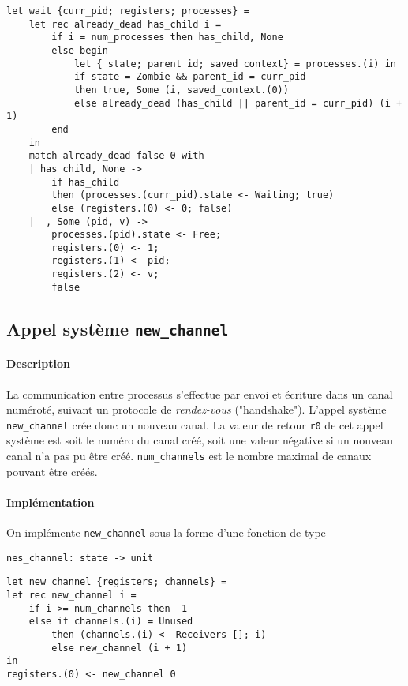 \documentclass[french, toc]{../cs-classes/cs-classes}
\begin{document}
\begin{verbatim}
let wait {curr_pid; registers; processes} =
    let rec already_dead has_child i =
        if i = num_processes then has_child, None
        else begin
            let { state; parent_id; saved_context} = processes.(i) in
            if state = Zombie && parent_id = curr_pid
            then true, Some (i, saved_context.(0))
            else already_dead (has_child || parent_id = curr_pid) (i + 1)
        end
    in
    match already_dead false 0 with
    | has_child, None ->
        if has_child
        then (processes.(curr_pid).state <- Waiting; true)
        else (registers.(0) <- 0; false)
    | _, Some (pid, v) ->
        processes.(pid).state <- Free;
        registers.(0) <- 1;
        registers.(1) <- pid;
        registers.(2) <- v;
        false
\end{verbatim}

\subsection{Appel système \texttt{new\_channel}}
\paragraph*{Description} 
La communication entre processus s’eﬀectue par envoi et écriture dans un canal numéroté, suivant un protocole de \emph{rendez-vous} ("handshake"). L'appel système \texttt{new\_channel} crée donc un nouveau canal. La valeur de retour \texttt{r0} de cet appel système est soit le numéro du canal créé, soit une valeur négative si un nouveau canal n'a pas pu être créé. \texttt{num\_channels} est le nombre maximal de canaux pouvant être créés.

\paragraph*{Implémentation} On implémente \texttt{new\_channel} sous la forme d'une fonction de type
\begin{center}
    \texttt{nes\_channel: state -> unit}
\end{center}

\begin{verbatim}
let new_channel {registers; channels} =
let rec new_channel i =
    if i >= num_channels then -1
    else if channels.(i) = Unused
        then (channels.(i) <- Receivers []; i)
        else new_channel (i + 1)
in
registers.(0) <- new_channel 0
\end{verbatim}
\end{document}
